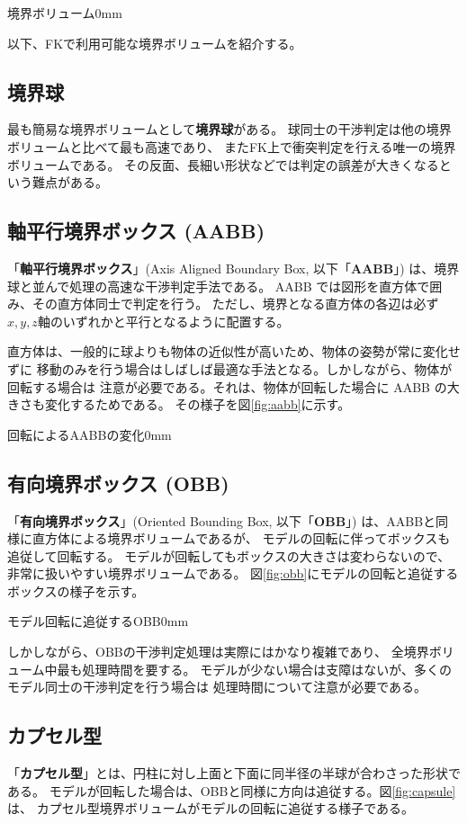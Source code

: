 	{境界ボリューム}{0mm}

以下、FKで利用可能な境界ボリュームを紹介する。

\subsection{境界球}
最も簡易な境界ボリュームとして\textbf{境界球}がある。
球同士の干渉判定は他の境界ボリュームと比べて最も高速であり、
またFK上で衝突判定を行える唯一の境界ボリュームである。
その反面、長細い形状などでは判定の誤差が大きくなるという難点がある。

\subsection{軸平行境界ボックス (AABB)}
「\textbf{軸平行境界ボックス}」(Axis Aligned Boundary Box, 以下「\textbf{AABB}」)
は、境界球と並んで処理の高速な干渉判定手法である。
AABB では図形を直方体で囲み、その直方体同士で判定を行う。
ただし、境界となる直方体の各辺は必ず \(x,y,z軸\)のいずれかと平行となるように配置する。

直方体は、一般的に球よりも物体の近似性が高いため、物体の姿勢が常に変化せずに
移動のみを行う場合はしばしば最適な手法となる。しかしながら、物体が回転する場合は
注意が必要である。それは、物体が回転した場合に AABB の大きさも変化するためである。
その様子を図\ref{fig:aabb}に示す。

	{回転によるAABBの変化}{0mm}

\subsection{有向境界ボックス (OBB)}
「\textbf{有向境界ボックス}」(Oriented Bounding Box, 以下「\textbf{OBB}」)
は、AABBと同様に直方体による境界ボリュームであるが、
モデルの回転に伴ってボックスも追従して回転する。
モデルが回転してもボックスの大きさは変わらないので、
非常に扱いやすい境界ボリュームである。
図\ref{fig:obb}にモデルの回転と追従するボックスの様子を示す。

	{モデル回転に追従するOBB}{0mm}

しかしながら、OBBの干渉判定処理は実際にはかなり複雑であり、
全境界ボリューム中最も処理時間を要する。
モデルが少ない場合は支障はないが、多くのモデル同士の干渉判定を行う場合は
処理時間について注意が必要である。

\subsection{カプセル型}
「\textbf{カプセル型}」とは、円柱に対し上面と下面に同半径の半球が合わさった形状である。
モデルが回転した場合は、OBBと同様に方向は追従する。図\ref{fig:capsule}は、
カプセル型境界ボリュームがモデルの回転に追従する様子である。

